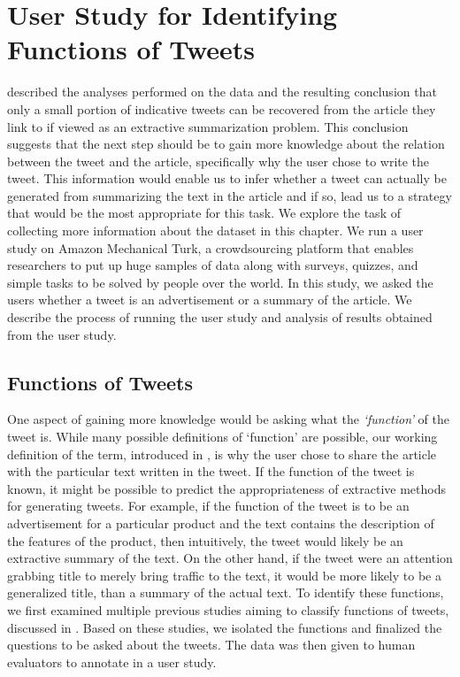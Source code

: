 \chapter{User Study for Identifying Functions of Tweets}
\label{chap:user}

 described the analyses performed on the data and the resulting conclusion that only a small portion of indicative tweets can be recovered from the article they link to if viewed as an extractive summarization problem. This conclusion suggests that the next step should be to gain more knowledge about the relation between the tweet and the article, specifically why the user chose to write the tweet. This information would enable us to infer whether a tweet can actually be generated from summarizing the text in the article and if so, lead us to a strategy that would be the most appropriate for this task. We explore the task of collecting more information about the dataset in this chapter. We run a user study on Amazon Mechanical Turk, a crowdsourcing platform that enables researchers to put up huge samples of data along with surveys, quizzes, and simple tasks to be solved by people over the world. In this study, we asked the users whether a tweet is an advertisement or a summary of the article. We describe the process of running the user study and analysis of results obtained from the user study.

\section{Functions of Tweets}
\label{sec:funcs}
One aspect of gaining more knowledge would be asking what the \textit{`function'} of the tweet is. While many possible definitions of `function' are possible, our working definition of the term, introduced in , is why the user chose to share the article with the particular text written in the tweet. If the function of the tweet is known, it might be possible to predict the appropriateness of extractive methods for generating tweets. For example, if the function of the tweet is to be an advertisement for a particular product and the text contains the description of the features of the product, then intuitively, the tweet would likely be an extractive summary of the text. On the other hand, if the tweet were an attention grabbing title to merely bring traffic to the text, it would be more likely to be a generalized title, than a summary of the actual text. To identify these functions, we first examined multiple previous studies aiming to classify functions of tweets, discussed in . Based on these studies, we isolated the functions and finalized the questions to be asked about the tweets. The data was then given to human evaluators to annotate in a user study.


